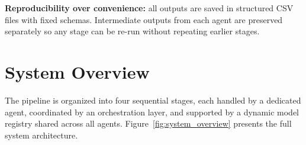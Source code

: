 \textbf{Reproducibility over convenience:} all outputs are saved in structured CSV
files with fixed schemas. Intermediate outputs from each agent are preserved
separately so any stage can be re-run without repeating earlier stages.

\section{System Overview}

The pipeline is organized into four sequential stages, each handled by a dedicated
agent, coordinated by an orchestration layer, and supported by a dynamic model
registry shared across all agents. Figure~\ref{fig:system_overview} presents the
full system architecture.

